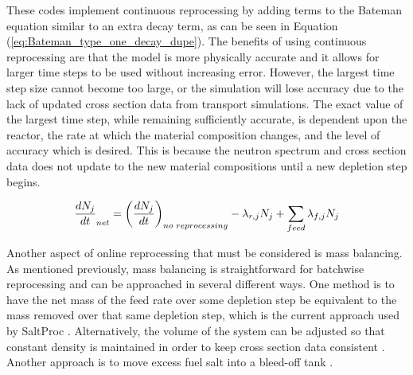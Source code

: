 These codes implement continuous reprocessing by adding terms to the Bateman equation similar to an extra decay term, as can be seen in Equation (\ref{eq:Bateman_type_one_decay_dupe}). The benefits of using continuous reprocessing are that the model is more physically accurate and it allows for larger time steps to be used without increasing error. However, the largest time step size cannot become too large, or the simulation will lose accuracy due to the lack of updated cross section data from transport simulations.
The exact value of the largest time step, while remaining sufficiently accurate, is dependent upon the reactor, the rate at which the material composition changes, and the level of accuracy which is desired.
This is because the neutron spectrum and cross section data does not update to the new material compositions until a new depletion step begins. 


\begin{equation} \hfill
\frac{dN_j}{dt}_{net} =\left( \frac{dN_j}{dt} \right)_{no\text{ }reprocessing} -  \lambda_{r, j} N_j + \sum_{feed} \lambda _{f, j} N_j
\hfill\label{eq:Bateman_type_one_decay_dupe} \end{equation}


Another aspect of online reprocessing that must be considered is mass balancing.
As mentioned previously, mass balancing is straightforward for batchwise reprocessing and can be approached in several different ways.
One method is to have the net mass of the feed rate over some depletion step be equivalent to the mass removed over that same depletion step, which is the current approach used by SaltProc \cite{rykhlevskii_modeling_2019}. Alternatively, the volume of the system can be adjusted so that constant density is maintained in order to keep cross section data consistent \cite{ridley_method_2017}. Another approach is to move excess fuel salt into a bleed-off tank \cite{ridley_method_2017}.

